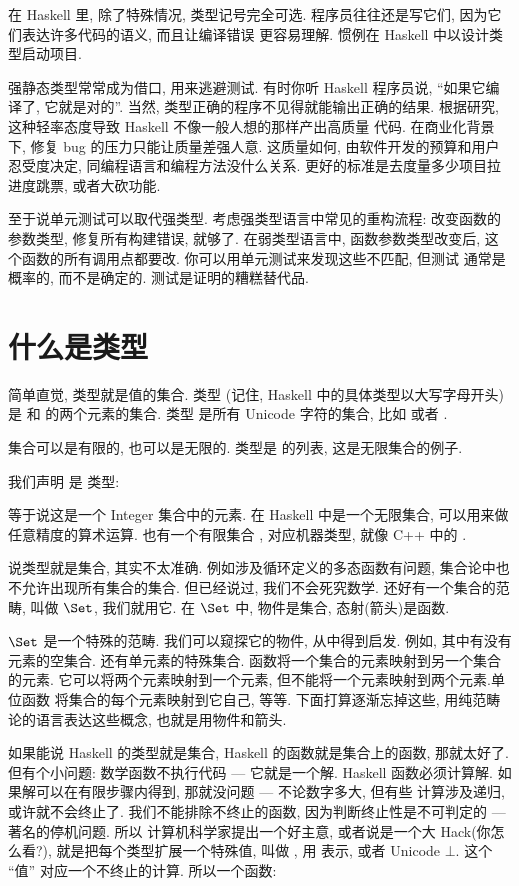 在 Haskell 里, 除了特殊情况, 类型记号完全可选. 程序员往往还是写它们, 因为它们表达许多代码的语义, 而且让编译错误
更容易理解. 惯例在 Haskell 中以设计类型启动项目.

强静态类型常常成为借口, 用来逃避测试. 有时你听 Haskell 程序员说, ``如果它编译了, 它就是对的''. 当然,
类型正确的程序不见得就能输出正确的结果. 根据研究, 这种轻率态度导致 Haskell 不像一般人想的那样产出高质量
代码. 在商业化背景下, 修复 bug 的压力只能让质量差强人意. 这质量如何, 由软件开发的预算和用户忍受度决定,
同编程语言和编程方法没什么关系. 更好的标准是去度量多少项目拉进度跳票, 或者大砍功能.

至于说单元测试可以取代强类型. 考虑强类型语言中常见的重构流程: 改变函数的参数类型, 修复所有构建错误, 就够了.
在弱类型语言中, 函数参数类型改变后, 这个函数的所有调用点都要改. 你可以用单元测试来发现这些不匹配, 但测试
通常是概率的, 而不是确定的. 测试是证明的糟糕替代品.

\section{什么是类型}

简单直觉, 类型就是值的集合. 类型  (记住, Haskell 中的具体类型以大写字母开头) 是  和
 的两个元素的集合. 类型  是所有 Unicode 字符的集合, 比如  或者 .

集合可以是有限的, 也可以是无限的.  类型是  的列表, 这是无限集合的例子.

我们声明  是  类型:

等于说这是一个 Integer 集合中的元素.
 在 Haskell 中是一个无限集合, 可以用来做任意精度的算术运算. 也有一个有限集合 ,
对应机器类型, 就像 C++ 中的 .

说类型就是集合, 其实不太准确. 例如涉及循环定义的多态函数有问题, 集合论中也不允许出现所有集合的集合. 但已经说过,
我们不会死究数学. 还好有一个集合的范畴, 叫做 $\Set$, 我们就用它. 在 $\Set$ 中, 物件是集合, 态射(箭头)是函数.

$\Set$ 是一个特殊的范畴. 我们可以窥探它的物件, 从中得到启发. 例如, 其中有没有元素的空集合. 还有单元素的特殊集合.
函数将一个集合的元素映射到另一个集合的元素. 它可以将两个元素映射到一个元素, 但不能将一个元素映射到两个元素.单位函数
将集合的每个元素映射到它自己, 等等. 下面打算逐渐忘掉这些, 用纯范畴论的语言表达这些概念, 也就是用物件和箭头.

如果能说 Haskell 的类型就是集合, Haskell 的函数就是集合上的函数, 那就太好了. 但有个小问题: 数学函数不执行代码
--- 它就是一个解. Haskell 函数必须计算解. 如果解可以在有限步骤内得到, 那就没问题 --- 不论数字多大, 但有些
计算涉及递归, 或许就不会终止了. 我们不能排除不终止的函数, 因为判断终止性是不可判定的 --- 著名的停机问题. 所以
计算机科学家提出一个好主意, 或者说是一个大 Hack(你怎么看?), 就是把每个类型扩展一个特殊值, 叫做 ,
用 \code{\_|\_} 表示, 或者 Unicode $\bot$. 这个 ``值'' 对应一个不终止的计算. 所以一个函数:

